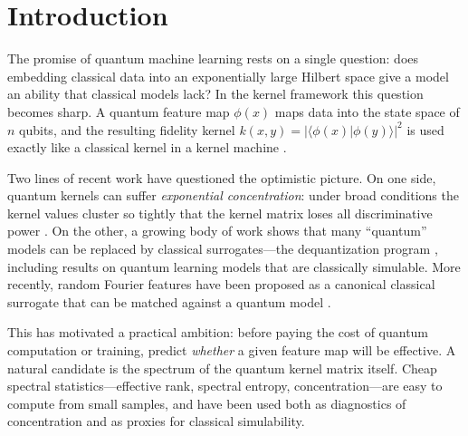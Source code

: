 \documentclass[aps,pra,preprint]{revtex4-2}
\begin{document}
\section{Introduction}
\label{sec:intro}

The promise of quantum machine learning rests on a single question: does embedding
classical data into an exponentially large Hilbert space give a model an ability that
classical models lack? In the kernel framework this question becomes sharp. A quantum
feature map $\phi(x)$ maps data into the state space of $n$ qubits, and the resulting
fidelity kernel $k(x,y)=|\langle\phi(x)|\phi(y)\rangle|^2$ is used exactly like a classical
kernel in a kernel machine \cite{schuld2019,havlicek2019}.

Two lines of recent work have questioned the optimistic picture. On one side, quantum
kernels can suffer \emph{exponential concentration}: under broad conditions the kernel
values cluster so tightly that the kernel matrix loses all discriminative power
\cite{thanasilp2024}. On the other, a growing body of work shows that many
``quantum'' models can be replaced by classical surrogates---the dequantization program
\cite{shin2024,sweke2025}, including results on quantum learning models that are
classically simulable. More recently, random Fourier features have been proposed as a
canonical classical surrogate that can be matched against a quantum model
\cite{thabet2026}.

This has motivated a practical ambition: before paying the cost of quantum
computation or training, predict \emph{whether} a given feature map will be effective.
A natural candidate is the spectrum of the quantum kernel matrix itself. Cheap spectral
statistics---effective rank, spectral entropy, concentration---are easy to compute from
small samples, and have been used both as diagnostics of concentration and as proxies for
classical simulability.
\end{document}
